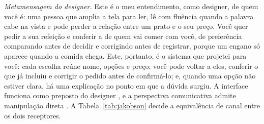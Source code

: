 \textit{Metamensagem do designer.} Este é o meu entendimento, como designer, de quem você é: uma pessoa que amplia a tela para ler, lê com fluência quando a palavra cabe na vista e pode perder a relação entre um prato e o seu preço. Você quer pedir a sua refeição e conferir a de quem vai comer com você, de preferência comparando antes de decidir e corrigindo antes de registrar, porque um engano só aparece quando a comida chega. Este, portanto, é o sistema que projetei para você: cada escolha reúne nome, opções e preço; você pode voltar a eles, conferir o que já incluiu e corrigir o pedido antes de confirmá-lo; e, quando uma opção não estiver clara, há uma explicação no ponto em que a dúvida surgiu. A interface funciona como preposto do designer \cite[p.~84]{desouza}, e a perspectiva comunicativa admite manipulação direta \cite[p.~230]{barbosa}. A Tabela~\ref{tab:jakobson} decide a equivalência de canal entre os dois receptores.

